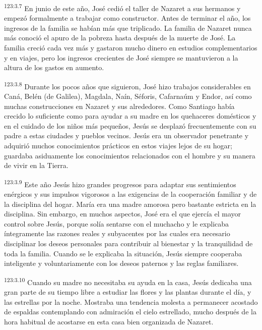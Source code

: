 \par 
\textsuperscript{123:3.7} En junio de este año, José cedió el taller de Nazaret a sus hermanos y empezó formalmente a trabajar como constructor. Antes de terminar el año, los ingresos de la familia se habían más que triplicado. La familia de Nazaret nunca más conoció el apuro de la pobreza hasta después de la muerte de José. La familia creció cada vez más y gastaron mucho dinero en estudios complementarios y en viajes, pero los ingresos crecientes de José siempre se mantuvieron a la altura de los gastos en aumento.

\par 
\textsuperscript{123:3.8} Durante los pocos años que siguieron, José hizo trabajos considerables en Caná, Belén (de Galilea), Magdala, Naín, Séforis, Cafarnaúm y Endor, así como muchas construcciones en Nazaret y sus alrededores. Como Santiago había crecido lo suficiente como para ayudar a su madre en los quehaceres domésticos y en el cuidado de los niños más pequeños, Jesús se desplazó frecuentemente con su padre a estas ciudades y pueblos vecinos. Jesús era un observador penetrante y adquirió muchos conocimientos prácticos en estos viajes lejos de su hogar; guardaba asiduamente los conocimientos relacionados con el hombre y su manera de vivir en la Tierra.

\par 
\textsuperscript{123:3.9} Este año Jesús hizo grandes progresos para adaptar sus sentimientos enérgicos y sus impulsos vigorosos a las exigencias de la cooperación familiar y de la disciplina del hogar. María era una madre amorosa pero bastante estricta en la disciplina. Sin embargo, en muchos aspectos, José era el que ejercía el mayor control sobre Jesús, porque solía sentarse con el muchacho y le explicaba íntegramente las razones reales y subyacentes por las cuales era necesario disciplinar los deseos personales para contribuir al bienestar y la tranquilidad de toda la familia. Cuando se le explicaba la situación, Jesús siempre cooperaba inteligente y voluntariamente con los deseos paternos y las reglas familiares.

\par 
\textsuperscript{123:3.10} Cuando su madre no necesitaba su ayuda en la casa, Jesús dedicaba una gran parte de su tiempo libre a estudiar las flores y las plantas durante el día, y las estrellas por la noche. Mostraba una tendencia molesta a permanecer acostado de espaldas contemplando con admiración el cielo estrellado, mucho después de la hora habitual de acostarse en esta casa bien organizada de Nazaret.

